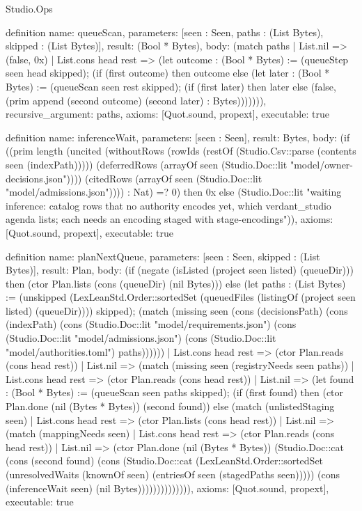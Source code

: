 \begin{lexlean}{Studio.Ops}
\begin{semanticmodule}
{definition{
  name: queueScan,
  parameters: [seen : Seen, paths : (List Bytes), skipped : (List Bytes)],
  result: (Bool * Bytes),
  body: (match paths
    | List.nil => (false, 0x)
    | List.cons head rest => (let outcome : (Bool * Bytes) := (queueStep seen head skipped); (if (first outcome) then outcome else (let later : (Bool * Bytes) := (queueScan seen rest skipped); (if (first later) then later else (false, (prim append (second outcome) (second later) : Bytes))))))),
  recursive_argument: paths,
  axioms: [Quot.sound, propext],
  executable: true
}

definition{
  name: inferenceWait,
  parameters: [seen : Seen],
  result: Bytes,
  body: (if ((prim length (uncited (withoutRows (rowIds (restOf (Studio.Csv::parse (contents seen (indexPath))))) (deferredRows (arrayOf seen (Studio.Doc::lit "model/owner-decisions.json")))) (citedRows (arrayOf seen (Studio.Doc::lit "model/admissions.json")))) : Nat) =? 0) then 0x else (Studio.Doc::lit "waiting inference: catalog rows that no authority encodes yet, which verdant_studio agenda lists; each needs an encoding staged with stage-encodings\n")),
  axioms: [Quot.sound, propext],
  executable: true
}

definition{
  name: planNextQueue,
  parameters: [seen : Seen, skipped : (List Bytes)],
  result: Plan,
  body: (if (negate (isListed (project seen listed) (queueDir))) then (ctor Plan.lists (cons (queueDir) (nil Bytes))) else (let paths : (List Bytes) := (unskipped (LexLeanStd.Order::sortedSet (queuedFiles (listingOf (project seen listed) (queueDir)))) skipped); (match (missing seen (cons (decisionsPath) (cons (indexPath) (cons (Studio.Doc::lit "model/requirements.json") (cons (Studio.Doc::lit "model/admissions.json") (cons (Studio.Doc::lit "model/authorities.toml") paths))))))
    | List.cons head rest => (ctor Plan.reads (cons head rest))
    | List.nil => (match (missing seen (registryNeeds seen paths))
    | List.cons head rest => (ctor Plan.reads (cons head rest))
    | List.nil => (let found : (Bool * Bytes) := (queueScan seen paths skipped); (if (first found) then (ctor Plan.done (nil (Bytes * Bytes)) (second found)) else (match (unlistedStaging seen)
      | List.cons head rest => (ctor Plan.lists (cons head rest))
      | List.nil => (match (mappingNeeds seen)
        | List.cons head rest => (ctor Plan.reads (cons head rest))
        | List.nil => (ctor Plan.done (nil (Bytes * Bytes)) (Studio.Doc::cat (cons (second found) (cons (Studio.Doc::cat (LexLeanStd.Order::sortedSet (unresolvedWaits (knownOf seen) (entriesOf seen (stagedPaths seen))))) (cons (inferenceWait seen) (nil Bytes)))))))))))))),
  axioms: [Quot.sound, propext],
  executable: true
}

}
\end{semanticmodule}
\end{lexlean}
